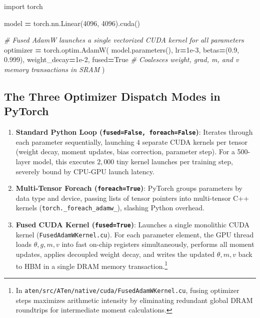 \documentclass[
  letterpaper,
]{scrbook}
\newenvironment{Shaded}{\begin{snugshade}}{\end{snugshade}}
\newcommand{\CommentTok}[1]{\textcolor[rgb]{0.56,0.35,0.01}{\textit{#1}}}
\newcommand{\DecValTok}[1]{\textcolor[rgb]{0.00,0.00,0.81}{#1}}
\newcommand{\FloatTok}[1]{\textcolor[rgb]{0.00,0.00,0.81}{#1}}
\newcommand{\ImportTok}[1]{#1}
\newcommand{\NormalTok}[1]{#1}
\newcommand{\OperatorTok}[1]{\textcolor[rgb]{0.81,0.36,0.00}{\textbf{#1}}}
\newcommand{\VariableTok}[1]{\textcolor[rgb]{0.00,0.00,0.00}{#1}}
\providecommand{\tightlist}{%
  \setlength{\itemsep}{0pt}\setlength{\parskip}{0pt}}
\begin{document}
\begin{Shaded}
\begin{Highlighting}[]
\ImportTok{import}\NormalTok{ torch}

\NormalTok{model }\OperatorTok{=}\NormalTok{ torch.nn.Linear(}\DecValTok{4096}\NormalTok{, }\DecValTok{4096}\NormalTok{).cuda()}

\CommentTok{\# Fused AdamW launches a single vectorized CUDA kernel for all parameters}
\NormalTok{optimizer }\OperatorTok{=}\NormalTok{ torch.optim.AdamW(}
\NormalTok{    model.parameters(),}
\NormalTok{    lr}\OperatorTok{=}\FloatTok{1e{-}3}\NormalTok{,}
\NormalTok{    betas}\OperatorTok{=}\NormalTok{(}\FloatTok{0.9}\NormalTok{, }\FloatTok{0.999}\NormalTok{),}
\NormalTok{    weight\_decay}\OperatorTok{=}\FloatTok{1e{-}2}\NormalTok{,}
\NormalTok{    fused}\OperatorTok{=}\VariableTok{True}  \CommentTok{\# Coalesces weight, grad, m, and v memory transactions in SRAM}
\NormalTok{)}
\end{Highlighting}
\end{Shaded}

\subsection{The Three Optimizer Dispatch Modes in
PyTorch}\label{the-three-optimizer-dispatch-modes-in-pytorch}

\begin{enumerate}
\def\labelenumi{\arabic{enumi}.}
\tightlist
\item
  \textbf{Standard Python Loop (\texttt{fused=False,\ foreach=False})}:
  Iterates through each parameter sequentially, launching \(4\) separate
  CUDA kernels per tensor (weight decay, moment updates, bias
  correction, parameter step). For a 500-layer model, this executes
  \(2,000\) tiny kernel launches per training step, severely bound by
  CPU-GPU launch latency.
\item
  \textbf{Multi-Tensor Foreach (\texttt{foreach=True})}: PyTorch groups
  parameters by data type and device, passing lists of tensor pointers
  into multi-tensor C++ kernels (\texttt{torch.\_foreach\_adamw\_}),
  slashing Python overhead.
\item
  \textbf{Fused CUDA Kernel (\texttt{fused=True})}: Launches a single
  monolithic CUDA kernel (\texttt{FusedAdamWKernel.cu}). For each
  parameter element, the GPU thread loads \(\theta, g, m, v\) into fast
  on-chip registers simultaneously, performs all moment updates, applies
  decoupled weight decay, and writes the updated \(\theta, m, v\) back
  to HBM in a single DRAM memory transaction.\footnote{In
    \texttt{aten/src/ATen/native/cuda/FusedAdamWKernel.cu}, fusing
    optimizer steps maximizes arithmetic intensity by eliminating
    redundant global DRAM roundtrips for intermediate moment
    calculations.}
\end{enumerate}
\end{document}
